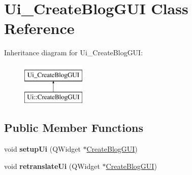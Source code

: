 \hypertarget{classUi__CreateBlogGUI}{}\section{Ui\+\_\+\+Create\+Blog\+G\+UI Class Reference}
\label{classUi__CreateBlogGUI}
Inheritance diagram for Ui\+\_\+\+Create\+Blog\+G\+UI\+:\begin{figure}[H]
\begin{center}
\leavevmode
\includegraphics[height=2.000000cm]{classUi__CreateBlogGUI}
\end{center}
\end{figure}
\subsection*{Public Member Functions}
\begin{DoxyCompactItemize}
\item 
void {\bfseries setup\+Ui} (Q\+Widget $\ast$\hyperlink{classCreateBlogGUI}{Create\+Blog\+G\+UI})\hypertarget{classUi__CreateBlogGUI_a4d102b6c5102839ac0645efc57084817}{}\label{classUi__CreateBlogGUI_a4d102b6c5102839ac0645efc57084817}

\item 
void {\bfseries retranslate\+Ui} (Q\+Widget $\ast$\hyperlink{classCreateBlogGUI}{Create\+Blog\+G\+UI})\hypertarget{classUi__CreateBlogGUI_ae97c2f597583c5470076cd4802de18a4}{}\label{classUi__CreateBlogGUI_ae97c2f597583c5470076cd4802de18a4}

\end{DoxyCompactItemize}
